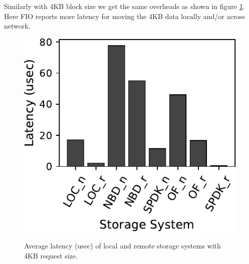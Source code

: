 Similarly with 4KB block size we get the same overheads as shown in figure
\ref{fig:fio_4k}. Here FIO reports more latency for moving the 4KB data locally
and/or across network.

\begin{figure}[H]
  \includegraphics[width=\linewidth]{figures/fio_4k.pdf}\\
\caption{Average latency (usec) of local and remote storage systems with 4KB request size.}
\label{fig:fio_4k}
\end{figure}

